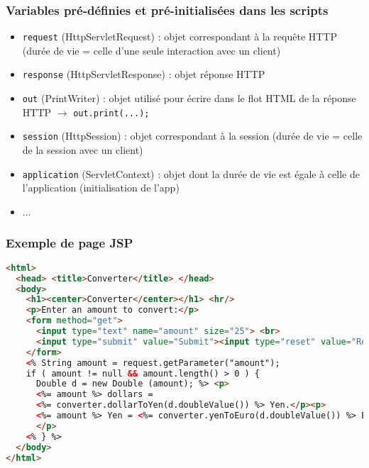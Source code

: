 \documentclass{beamer}
\begin{document}
\begin{frame}
  \frametitle{Variables pré-définies et pré-initialisées dans les scripts}
    \begin{itemize}  
    \item \texttt{request} (HttpServletRequest) : objet correspondant
      à la requête HTTP (durée de vie = celle d’une seule interaction
      avec un client)
    \item \texttt{response} (HttpServletResponse) : objet réponse HTTP
    \item \texttt{out} (PrintWriter) : objet utilisé pour écrire dans
      le flot HTML de la réponse HTTP $\rightarrow$ \texttt{out.print(...);}
    \item \texttt{session} (HttpSession) : objet correspondant à la
      session (durée de vie = celle de la session avec un client)
    \item \texttt{application} (ServletContext) : objet 
      dont la durée de vie est égale à celle de l’application (initialisation de l'app)
    \item ...
  \end{itemize}
\end{frame}

\begin{frame}[fragile]
  \frametitle{Exemple de page JSP}
  \begin{flushleft}
  \begin{lstlisting}[language=HTML,basicstyle=\tiny]
<html>
  <head> <title>Converter</title> </head>
  <body>
    <h1><center>Converter</center></h1> <hr/>
    <p>Enter an amount to convert:</p>
    <form method="get">
      <input type="text" name="amount" size="25"> <br>
      <input type="submit" value="Submit"><input type="reset" value="Reset">
    </form>
    <% String amount = request.getParameter("amount");
    if ( amount != null && amount.length() > 0 ) {
      Double d = new Double (amount); %> <p>
      <%= amount %> dollars =
      <%= converter.dollarToYen(d.doubleValue()) %> Yen.</p><p>
      <%= amount %> Yen = <%= converter.yenToEuro(d.doubleValue()) %> Euro.
      </p>
    <% } %>
  </body>
</html>
\end{lstlisting}
  \end{flushleft}  
\end{frame}
\end{document}
